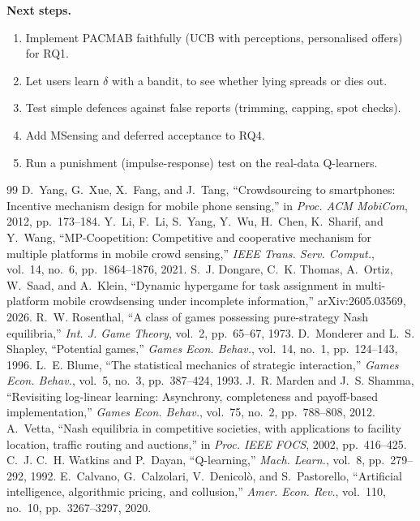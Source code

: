 \documentclass[12pt,draftcls,onecolumn]{IEEEtran}
\begin{document}
\textbf{Next steps.}
\begin{enumerate}
\item Implement PACMAB faithfully (UCB with perceptions, personalised offers) for RQ1.
\item Let users learn $\delta$ with a bandit, to see whether lying spreads or dies out.
\item Test simple defences against false reports (trimming, capping, spot checks).
\item Add MSensing and deferred acceptance to RQ4.
\item Run a punishment (impulse-response) test on the real-data Q-learners.
\end{enumerate}

\begin{thebibliography}{99}
 D.~Yang, G.~Xue, X.~Fang, and J.~Tang, ``Crowdsourcing to smartphones: Incentive mechanism design for mobile phone sensing,'' in \emph{Proc. ACM MobiCom}, 2012, pp.~173--184.
 Y.~Li, F.~Li, S.~Yang, Y.~Wu, H.~Chen, K.~Sharif, and Y.~Wang, ``MP-Coopetition: Competitive and cooperative mechanism for multiple platforms in mobile crowd sensing,'' \emph{IEEE Trans. Serv. Comput.}, vol.~14, no.~6, pp.~1864--1876, 2021.
 S.~J. Dongare, C.~K. Thomas, A.~Ortiz, W.~Saad, and A.~Klein, ``Dynamic hypergame for task assignment in multi-platform mobile crowdsensing under incomplete information,'' arXiv:2605.03569, 2026.
 R.~W. Rosenthal, ``A class of games possessing pure-strategy Nash equilibria,'' \emph{Int. J. Game Theory}, vol.~2, pp.~65--67, 1973.
 D.~Monderer and L.~S. Shapley, ``Potential games,'' \emph{Games Econ. Behav.}, vol.~14, no.~1, pp.~124--143, 1996.
 L.~E. Blume, ``The statistical mechanics of strategic interaction,'' \emph{Games Econ. Behav.}, vol.~5, no.~3, pp.~387--424, 1993.
 J.~R. Marden and J.~S. Shamma, ``Revisiting log-linear learning: Asynchrony, completeness and payoff-based implementation,'' \emph{Games Econ. Behav.}, vol.~75, no.~2, pp.~788--808, 2012.
 A.~Vetta, ``Nash equilibria in competitive societies, with applications to facility location, traffic routing and auctions,'' in \emph{Proc. IEEE FOCS}, 2002, pp.~416--425.
 C.~J. C.~H. Watkins and P.~Dayan, ``Q-learning,'' \emph{Mach. Learn.}, vol.~8, pp.~279--292, 1992.
 E.~Calvano, G.~Calzolari, V.~Denicol\`o, and S.~Pastorello, ``Artificial intelligence, algorithmic pricing, and collusion,'' \emph{Amer. Econ. Rev.}, vol.~110, no.~10, pp.~3267--3297, 2020.

\end{thebibliography}
\end{document}
